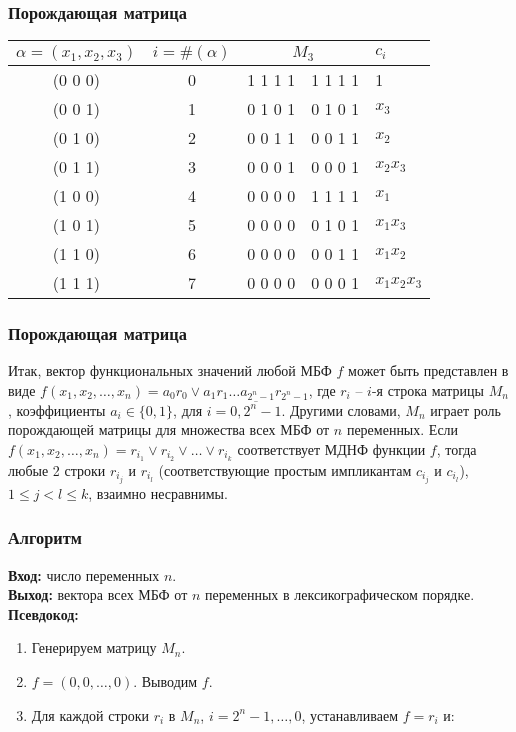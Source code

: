 \documentclass[14pt]{beamer}
\theoremstyle{plain} %
\theoremstyle{remark}
\newcommand{\al}{\alpha}
\newcommand\T{\rule{0pt}{2.6ex}}       %
\newcommand\B{\rule[-1.2ex]{0pt}{0pt}} %
\begin{document}
\begin{frame}
\frametitle{Порождающая матрица}
\begin{center}
 \begin{tabular}{ c | c | c | l }
  $\al = (x_1, x_2, x_3)$ & $i = \#(\al)$ & $M_3$ & $c_i$ \\
  \hline
  (0 0 0) & 	0	& 1 1 1 1\ \ 1 1 1 1 & 1 \T  \\
  (0 0 1) & 	1	& 0 1 0 1\ \ 0 1 0 1 & $x_3$     \\
  (0 1 0) & 	2	& 0 0 1 1\ \ 0 0 1 1 & $x_2$     \\
  (0 1 1) & 	3	& 0 0 0 1\ \ 0 0 0 1 & $x_2x_3$   \\
  (1 0 0) & 	4	& 0 0 0 0\ \ 1 1 1 1 & $x_1$     \\
  (1 0 1) & 	5	& 0 0 0 0\ \ 0 1 0 1 & $x_1x_3$   \\
  (1 1 0) & 	6	& 0 0 0 0\ \ 0 0 1 1 & $x_1x_2$   \\
  (1 1 1) & 	7	& 0 0 0 0\ \ 0 0 0 1 & $x_1x_2x_3$ \B \\
  \hline
  \end{tabular}
\end{center}
\end{frame}

\begin{frame}
\frametitle{Порождающая матрица}
Итак, вектор функциональных значений любой МБФ $f$ может быть представлен
  в виде
  $f(x_1, x_2, \dots, x_n) = a_0 r_0 \vee a_1 r_1 \dots a_{2^n-1} r_{2^n-1}$, 
  где $r_i$ -- $i$-я строка матрицы $M_n$, коэффициенты $a_i \in \{0,1\}$, для
  $i = \overline{0, 2^n - 1}$. Другими словами, 
  $M_n$ играет роль порождающей матрицы для множества всех МБФ от $n$ переменных.
  Если $f(x_1, x_2, \dots, x_n) = r_{i_1} \vee r_{i_2} \vee \dots \vee r_{i_k}$
  соответствует МДНФ функции $f$, тогда любые 2 строки $r_{i_j}$ и $r_{i_l}$ 
  (соответствующие простым импликантам $c_{i_j}$ и $c_{i_l}$), $1 \leq j < l \leq k$,
  взаимно несравнимы.
\end{frame}

\begin{frame}
\frametitle{Алгоритм}
\textbf{Вход:} число переменных $n$.\\
    \textbf{Выход:} вектора всех МБФ от $n$ переменных в лексикографическом порядке.\\
    \textbf{Псевдокод:}\par
      \begin{enumerate}
      \item Генерируем матрицу $M_n$. 
      \item $f = (0, 0, \dots, 0)$. Выводим  $f$.
      \item Для каждой строки $r_i$ в $M_n$, $i = 2^n - 1, \dots, 0$, 
	устанавливаем $f = r_i$ и:\par
      \end{enumerate}
\end{frame}
\end{document}
